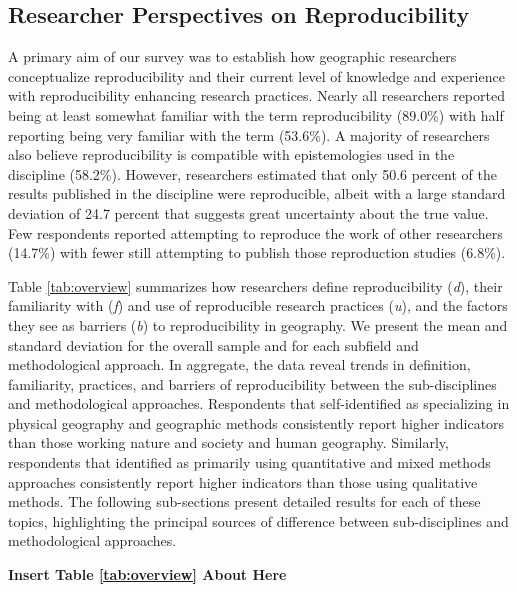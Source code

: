 \documentclass[]{interact}
\theoremstyle{plain}%
\theoremstyle{definition}
\theoremstyle{remark}
\begin{document}
\subsection*{Researcher Perspectives on Reproducibility}
A primary aim of our survey was to establish how geographic researchers conceptualize reproducibility and their current level of knowledge and experience with reproducibility enhancing research practices.
Nearly all researchers reported being at least somewhat familiar with the term reproducibility (89.0\%) with half reporting being very familiar with the term (53.6\%).
A majority of researchers also believe reproducibility is compatible with epistemologies used in the discipline (58.2\%). 
However, researchers estimated that only 50.6 percent of the results published in the discipline were reproducible, albeit with a large standard deviation of 24.7 percent that suggests great uncertainty about the true value. 
Few respondents reported attempting to reproduce the work of other researchers (14.7\%) with fewer still attempting to publish those reproduction studies (6.8\%). 

Table \ref{tab:overview} summarizes how researchers define reproducibility (\textit{d}), their familiarity with (\textit{f}) and use of reproducible research practices (\textit{u}), and the factors they see as barriers (\textit{b}) to reproducibility in geography. 
We present the mean and standard deviation for the overall sample and for each subfield and methodological approach.
In aggregate, the data reveal trends in definition, familiarity, practices, and barriers of reproducibility between the sub-disciplines and methodological approaches. 
Respondents that self-identified as specializing in physical geography and geographic methods consistently report higher indicators than those working nature and society and human geography.
Similarly, respondents that identified as primarily using quantitative and mixed methods approaches consistently report higher indicators than those using qualitative methods.
The following sub-sections present detailed results for each of these topics, highlighting the principal sources of difference between sub-disciplines and methodological approaches.

\begin{center}
\textbf{Insert Table \ref{tab:overview} About Here}
\end{center}


\end{document}
